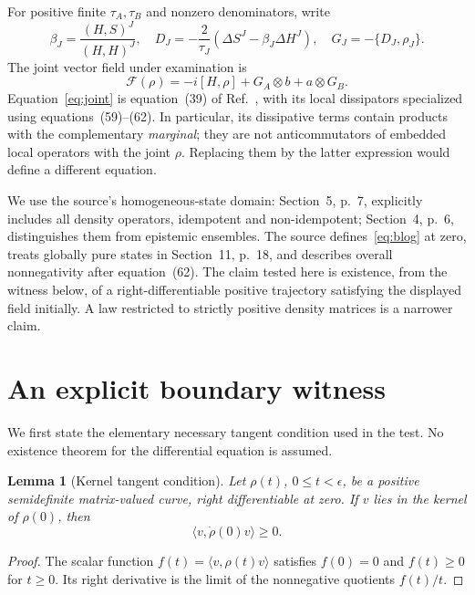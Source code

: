 \documentclass[11pt]{article}
\newtheorem{lemma}[theorem]{Lemma}
\newcommand{\ac}[2]{\{#1,#2\}}
\begin{document}
For positive finite $\tau_A,\tau_B$ and nonzero denominators, write
\begin{equation}
 \beta_J=\frac{(H,S)^J}{(H,H)^J},\quad
 D_J=-\frac{2}{\tau_J}(\Delta S^J-\beta_J\Delta H^J),\quad
 G_J=-\ac{D_J}{\rho_J}.\label{eq:dissipator}
\end{equation}
The joint vector field under examination is
\begin{equation}
 \mathcal F(\rho)=-i[H,\rho]+G_A\otimes b+a\otimes G_B.\label{eq:joint}
\end{equation}
Equation~\eqref{eq:joint} is equation~(39) of Ref.~\cite{RayBeretta}, with its local dissipators specialized using equations~(59)--(62). In particular, its dissipative terms contain products with the complementary \emph{marginal}; they are not anticommutators of embedded local operators with the joint $\rho$. Replacing them by the latter expression would define a different equation.

We use the source's homogeneous-state domain: Section~5, p.~7, explicitly includes all density operators, idempotent and non-idempotent; Section~4, p.~6, distinguishes them from epistemic ensembles. The source defines~\eqref{eq:blog} at zero, treats globally pure states in Section~11, p.~18, and describes overall nonnegativity after equation~(62). The claim tested here is existence, from the witness below, of a right-differentiable positive trajectory satisfying the displayed field initially. A law restricted to strictly positive density matrices is a narrower claim.

\section{An explicit boundary witness}
We first state the elementary necessary tangent condition used in the test. No existence theorem for the differential equation is assumed.

\begin{lemma}[Kernel tangent condition]\label{lem:tangent}
Let $\rho(t)$, $0\leq t<\epsilon$, be a positive semidefinite matrix-valued curve, right differentiable at zero. If $v$ lies in the kernel of $\rho(0)$, then
\begin{equation}
 \langle v,\dot\rho(0)v\rangle\geq0.\label{eq:tangent}
\end{equation}
\end{lemma}
\begin{proof}
The scalar function $f(t)=\langle v,\rho(t)v\rangle$ satisfies $f(0)=0$ and $f(t)\geq0$ for $t\geq0$. Its right derivative is the limit of the nonnegative quotients $f(t)/t$.
\end{proof}
\end{document}
